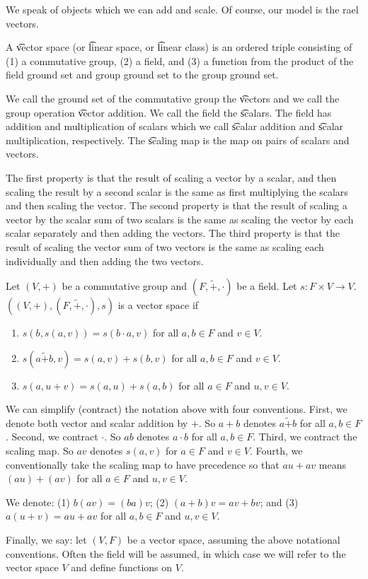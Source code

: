 

We speak of objects which we can add and scale. Of course, our model is the rael vectors.


A \t{vector space} (or \t{linear space}, or \t{linear class}) is an ordered triple consisting of
(1) a commutative group, (2) a field, and (3) a function from the product of the field ground set and group ground set to the group ground set.

We call the ground set of the commutative group the \t{vectors} and we call the group operation \t{vector addition}.
We call the field the \t{scalars}.
The field has addition and multiplication of scalars which we call \t{scalar addition} and \t{scalar multiplication}, respectively.
The \t{scaling map} is the map on pairs of scalars and vectors.

The first property is that the result of scaling a vector by a scalar, and then scaling the result by a second scalar is the same as first multiplying the scalars and then scaling the vector.
The second property is that the result of scaling a vector by the scalar sum of two scalars is the same as scaling the vector by each scalar separately and then adding the vectors.
The third property is that the result of scaling the vector sum of two vectors is the same as scaling each individually and then adding the two vectors.


Let $(V,+)$ be a commutative group and $(F, \tilde{+}, \cdot)$ be a field.
Let $s: F \times V \to V$. $((V, +), (F, \tilde{+}, \cdot), s)$ is a vector space if
\begin{enumerate}
  \item $s(b,s(a, v)) = s(b \cdot a, v)$ for all $a, b \in F$ and $v \in V$.
  \item $s(a\tilde{+}b, v) = s(a, v) + s(b, v)$ for all $a, b \in F$ and $v \in V$.
  \item $s(a, u + v) = s(a,u) + s(a, b)$ for all $a \in F$ and $u, v \in V$.
\end{enumerate}

We can simplify (contract) the notation above with four conventions.
First, we denote both vector and scalar addition by $+$.
So $a + b$ denotes $a \tilde{+} b$ for all $a, b \in F$.
Second, we contract $\cdot$.
So $ab$ denotes $a \cdot b$ for all $a, b \in F$.
Third, we contract the scaling map.
So $av$ denotes $s(a, v)$ for $a \in F$ and $v \in V$.
Fourth, we conventionally take the scaling map to have precedence so that $au + av$ means $(au) + (av)$ for all $a \in F$ and $u,v \in V$.

We denote:
(1)
$b(av) = (ba)v$;
(2)
$(a+b)v = av + bv$;
and (3)
$a(u + v) = au + av$
for all
$a,b \in F$ and $u, v \in V$.

Finally, we say: let $(V, F)$
be a vector space, assuming the
above notational conventions.
Often the field will be assumed, in which case we will refer to the vector space $V$ and define functions on $V$.
